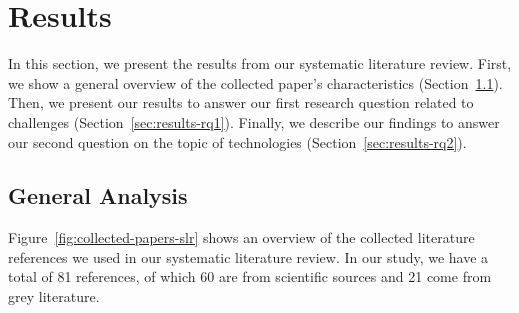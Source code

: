 
\section{Results}\label{sec:results}

In this section, we present the results from our systematic literature review. First, we show a general overview of the collected paper's characteristics (Section~\ref{sec:results-general}). Then, we present our results to answer our first research question related to challenges (Section~\ref{sec:results-rq1}). Finally, we describe our findings to answer our second question on the topic of technologies (Section~\ref{sec:results-rq2}).

\subsection{General Analysis}\label{sec:results-general}



Figure~\ref{fig:collected-papers-slr} shows an overview of the collected literature references we used in our systematic literature review. In our study, we have a total of 81 references, of which 60 are from scientific sources and 21 come from grey literature. 



